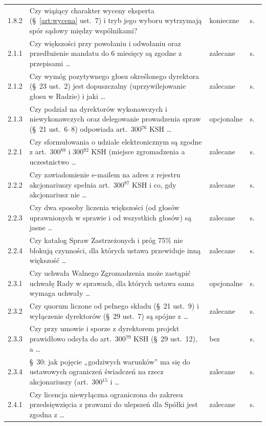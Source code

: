 \documentclass[12pt,a4paper]{report}
\begin{document}
{\begin{longtable}{@{}p{1.2cm} p{9.6cm} p{2.3cm} p{1.4cm}@{}}
1.8.2 & Czy wiążący charakter wyceny eksperta (§~\ref{art:wycena} ust.~7) i tryb jego wyboru wytrzymają spór sądowy między wspólnikami? & konieczne & s.~\pageref{memo:1.8.2} \\
2.1.1 & Czy większości przy powołaniu i odwołaniu oraz przedłużenie mandatu do 6 miesięcy są zgodne z przepisami \ldots & zalecane & s.~\pageref{memo:2.1.1} \\
2.1.2 & Czy wymóg pozytywnego głosu określonego dyrektora (§~23 ust.~2) jest dopuszczalny (uprzywilejowanie głosu w Radzie) i jaki \ldots & zalecane & s.~\pageref{memo:2.1.2} \\
2.1.3 & Czy podział na dyrektorów wykonawczych i niewykonawczych oraz delegowanie prowadzenia spraw (§~21 ust.~6--8) odpowiada art.~300$^{76}$ KSH \ldots & opcjonalne & s.~\pageref{memo:2.1.3} \\
2.2.1 & Czy sformułowania o udziale elektronicznym są zgodne z art.~300$^{88}$ i 300$^{92}$ KSH (miejsce zgromadzenia a uczestnictwo \ldots & zalecane & s.~\pageref{memo:2.2.1} \\
2.2.2 & Czy zawiadomienie e-mailem na adres z rejestru akcjonariuszy spełnia art.~300$^{87}$ KSH i co, gdy akcjonariusz nie \ldots & zalecane & s.~\pageref{memo:2.2.2} \\
2.2.3 & Czy dwa sposoby liczenia większości (od głosów uprawnionych w sprawie i od wszystkich głosów) są jasne \ldots & zalecane & s.~\pageref{memo:2.2.3} \\
2.2.4 & Czy katalog Spraw Zastrzeżonych i próg 75\% nie blokują czynności, dla których ustawa przewiduje inną większość \ldots & zalecane & s.~\pageref{memo:2.2.4} \\
2.3.1 & Czy uchwała Walnego Zgromadzenia może zastąpić uchwałę Rady w sprawach, dla których ustawa sama wymaga uchwały \ldots & opcjonalne & s.~\pageref{memo:2.3.1} \\
2.3.2 & Czy quorum liczone od pełnego składu (§~21 ust.~9) i wyłączenie dyrektorów (§~29 ust.~7) są spójne z \ldots & zalecane & s.~\pageref{memo:2.3.2} \\
2.3.3 & Czy przy umowie i sporze z dyrektorem projekt prawidłowo odsyła do art.~300$^{79}$ KSH (§~29 ust.~12), a \ldots & bez & s.~\pageref{memo:2.3.3} \\
2.3.4 & §~30: jak pojęcie „godziwych warunków” ma się do ustawowych ograniczeń świadczeń na rzecz akcjonariuszy (art.~300$^{15}$ i \ldots & zalecane & s.~\pageref{memo:2.3.4} \\
2.4.1 & Czy licencja niewyłączna ograniczona do zakresu przedsięwzięcia z prawami do ulepszeń dla Spółki jest zgodna z \ldots & zalecane & s.~\pageref{memo:2.4.1} \\

\end{longtable}}
\end{document}
